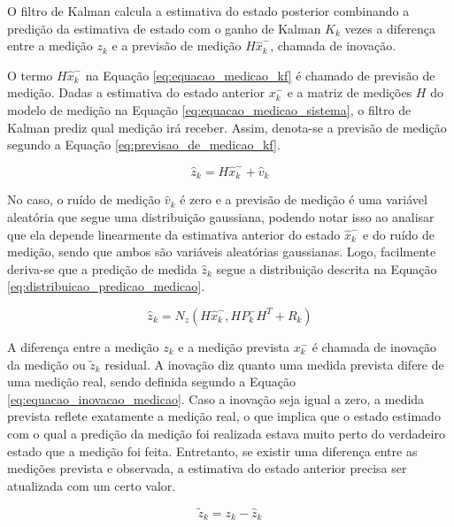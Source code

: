 \documentclass[acronym, symbols, table, deposito]{fei}
\begin{document}
				O filtro de Kalman calcula a estimativa do estado posterior combinando a predição da estimativa de estado com o ganho de Kalman $K_k$ vezes a diferença entre a medição $z_k$ e a previsão de medição $H\hat{x}_{k}^{-}$, chamada de inovação.
				
				O termo $H\hat{x}_{k}^{-}$ na Equação \eqref{eq:equacao_medicao_kf} é chamado de previsão de medição. Dadas a estimativa do estado anterior ${x}_{k}^{-}$ e a matriz de medições $H$ do modelo de medição na Equação \eqref{eq:equacao_medicao_sistema}, o filtro de Kalman prediz qual medição irá receber. Assim, denota-se a previsão de medição segundo a Equação \eqref{eq:previsao_de_medicao_kf}.
				
				\begin{equation} \label{eq:previsao_de_medicao_kf}
					\hat{z}_k = H\hat{x}_{k}^{-} + \hat{v}_k
				\end{equation}
			
				No caso, o ruído de medição $\hat{v}_k$ é zero e a previsão de medição é uma variável aleatória que segue uma distribuição gaussiana, podendo notar isso ao analisar que ela depende linearmente da estimativa anterior do estado $\hat{x}_{k}^{-}$ e do ruído de medição, sendo que ambos são variáveis aleatórias gaussianas. Logo, facilmente deriva-se que a predição de medida $\hat{z}_k$ segue a distribuição descrita na Equação \eqref{eq:distribuicao_predicao_medicao}.
				
				\begin{equation} \label{eq:distribuicao_predicao_medicao}
					\hat{z}_k = N_z( H\hat{x}_{k}^{-}, HP_{k}^{-}H^T + R_k)
				\end{equation}
			
				A diferença entre a medição $z_k$ e a medição prevista $x_{k}^{-}$ é chamada de inovação da medição ou $\tilde{z}_k$ residual. A inovação diz quanto uma medida prevista difere de uma medição real, sendo definida segundo a Equação \eqref{eq:equacao_inovacao_medicao}. Caso a inovação seja igual a zero, a medida prevista reflete exatamente a medição real, o que implica que o estado estimado com o qual a predição da medição foi realizada estava muito perto do verdadeiro estado que a medição foi feita. Entretanto, se existir uma diferença entre as medições prevista e observada, a estimativa do estado anterior precisa ser atualizada com um certo valor.
				
				\begin{equation} \label{eq:equacao_inovacao_medicao}
					\tilde{z}_k = z_k - \hat{z}_k
				\end{equation}
				
\end{document}
